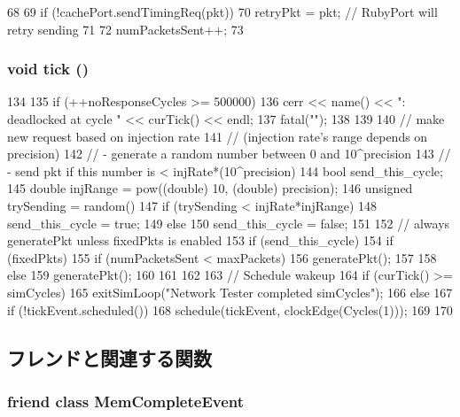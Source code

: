 \begin{DoxyCode}
68 {
69     if (!cachePort.sendTimingReq(pkt)) {
70         retryPkt = pkt; // RubyPort will retry sending
71     }
72     numPacketsSent++;
73 }
\end{DoxyCode}
\hypertarget{classNetworkTest_a873dd91783f9efb4a590aded1f70d6b0}{
\subsubsection[{tick}]{\setlength{\rightskip}{0pt plus 5cm}void tick ()}}
\label{classNetworkTest_a873dd91783f9efb4a590aded1f70d6b0}



\begin{DoxyCode}
134 {
135     if (++noResponseCycles >= 500000) {
136         cerr << name() << ": deadlocked at cycle " << curTick() << endl;
137         fatal("");
138     }
139 
140     // make new request based on injection rate
141     // (injection rate's range depends on precision)
142     // - generate a random number between 0 and 10^precision
143     // - send pkt if this number is < injRate*(10^precision)
144     bool send_this_cycle;
145     double injRange = pow((double) 10, (double) precision);
146     unsigned trySending = random() %
147     if (trySending < injRate*injRange)
148         send_this_cycle = true;
149     else
150         send_this_cycle = false;
151 
152     // always generatePkt unless fixedPkts is enabled
153     if (send_this_cycle) {
154         if (fixedPkts) {
155             if (numPacketsSent < maxPackets) {
156                 generatePkt();
157             }
158         } else {
159             generatePkt();
160         }
161     }
162 
163     // Schedule wakeup
164     if (curTick() >= simCycles)
165         exitSimLoop("Network Tester completed simCycles");
166     else {
167         if (!tickEvent.scheduled())
168             schedule(tickEvent, clockEdge(Cycles(1)));
169     }
170 }
\end{DoxyCode}


\subsection{フレンドと関連する関数}
\hypertarget{classNetworkTest_a24edf30be1f143e9b680a6b2e3747fbd}{
\subsubsection[{MemCompleteEvent}]{\setlength{\rightskip}{0pt plus 5cm}friend class MemCompleteEvent}}
\label{classNetworkTest_a24edf30be1f143e9b680a6b2e3747fbd}


